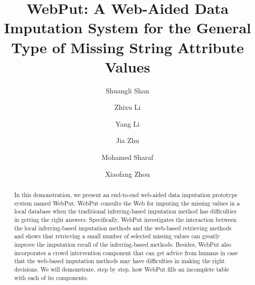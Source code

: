 \documentclass[sigconf]{acmart}
\begin{document}
\title{WebPut: A Web-Aided Data Imputation System for the General Type of Missing String Attribute Values}

\author{Shuangli Shan}

\author{Zhixu Li}

\author{Yang Li}

\author{Jia Zhu}

\author{Mohamed Sharaf}

\author{Xiaofang Zhou}



\begin{abstract}
In this demonstration, we present an end-to-end web-aided data imputation prototype system named WebPut. WebPut consults the Web for imputing the missing values in a local database when the traditional inferring-based imputation method has difficulties in getting the right answers.
%
Specifically, WebPut investigates the interaction between the local inferring-based imputation methods and the web-based retrieving methods and shows that retrieving a small number of selected missing values can greatly improve the imputation recall of the inferring-based methods.
%
Besides, WebPut also incorporates a crowd intervention component that can get advice from humans in case that the web-based imputation methods may have difficulties in making the right decisions.
%
We will demonstrate, step by step, how WebPut fills an incomplete table with each of its components. %
\end{abstract}
\end{document}
